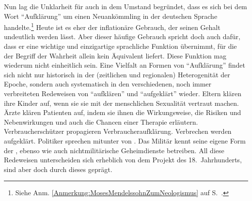 Nun lag die Unklarheit für
auch in dem Umstand begründet, dass es sich bei dem Wort \enquote{Aufklärung}
um einen Neuankömmling in der deutschen Sprache handelte.\footnote{Siehe
Anm. \ref{Anmerkung:MosesMendelssohnZumNeologismus} auf
S.~\pageref{Anmerkung:MosesMendelssohnZumNeologismus}.} Heute ist es eher der
inflationäre Gebrauch, der seinen Gehalt undeutlich werden lässt. Aber dieser häufige Gebrauch spricht doch auch dafür, dass er eine wichtige und einzigartige sprachliche Funktion
übernimmt, für die der Begriff der Wahrheit allein kein Äquivalent liefert.
Diese Funktion mag wiederum nicht einheitlich sein. Eine Vielfalt an Formen von
\enquote{Aufklärung} findet sich nicht nur historisch in der (zeitlichen und
regionalen) Heterogenität der Epoche, sondern auch systematisch in den
verschiedenen, noch immer verbreiteten Redeweisen von \enquote{aufklären} und
\enquote{aufgeklärt} wieder. Eltern klären ihre Kinder auf,
wenn sie sie mit der menschlichen Sexualität vertraut machen. Ärzte klären
Patienten auf, indem sie ihnen die Wirkungsweise, die Risiken und Nebenwirkungen
und auch die Chancen einer Therapie erläutern. Verbraucherschützer propagieren
Verbraucheraufklärung. Verbrechen werden aufgeklärt. Politiker sprechen mitunter
von . Das Militär kennt seine eigene Form der
, ebenso wie auch nichtmilitärische Geheimdienste
 betreiben. All diese Redeweisen unterscheiden sich
erheblich von dem Projekt des 18.\ Jahrhunderts, sind aber doch durch dieses
geprägt.

